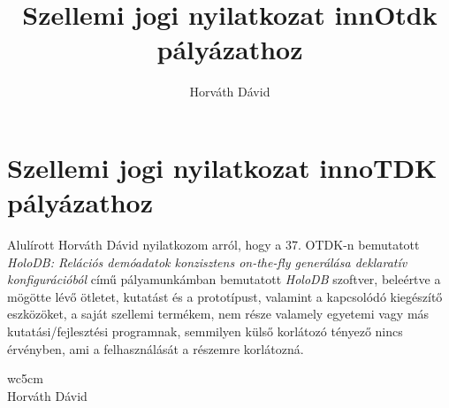\documentclass{article}
\title{Szellemi jogi nyilatkozat innOtdk pályázathoz}
\author{Horváth Dávid}
\begin{document}
\Large

\section*{Szellemi jogi nyilatkozat innoTDK pályázathoz}

Alulírott Horváth Dávid nyilatkozom arról, hogy a 37. OTDK-n bemutatott \textit{HoloDB: Relációs demóadatok konzisztens on-the-fly generálása deklaratív konfigurációból} című pályamunkámban bemutatott \textit{HoloDB} szoftver, beleértve a mögötte lévő ötletet, kutatást és a prototípust, valamint a kapcsolódó kiegészítő eszközöket, a saját szellemi termékem, nem része valamely egyetemi vagy más kutatási/fejlesztési programnak, semmilyen külső korlátozó tényező nincs érvényben, ami a felhasználását a részemre korlátozná.

\vspace{1.5cm}

\begin{flushright}
\begin{tabular}{wc{5cm}}
\hrulefill \\
Horváth Dávid
\end{tabular}
\end{flushright}
\end{document}
